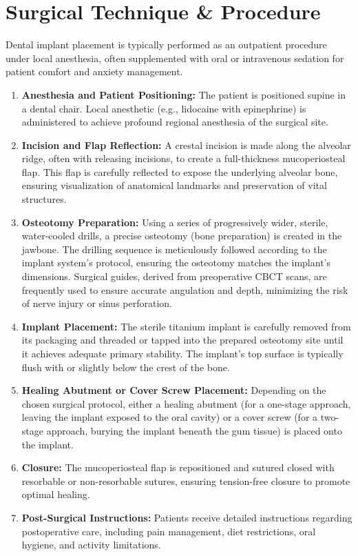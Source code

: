 \section*{Surgical Technique \& Procedure}
Dental implant placement is typically performed as an outpatient procedure under local anesthesia, often supplemented with oral or intravenous sedation for patient comfort and anxiety management.

\begin{enumerate}
  \item \textbf{Anesthesia and Patient Positioning:} The patient is positioned supine in a dental chair. Local anesthetic (e.g., lidocaine with epinephrine) is administered to achieve profound regional anesthesia of the surgical site.
  
  \item \textbf{Incision and Flap Reflection:} A crestal incision is made along the alveolar ridge, often with releasing incisions, to create a full-thickness mucoperiosteal flap. This flap is carefully reflected to expose the underlying alveolar bone, ensuring visualization of anatomical landmarks and preservation of vital structures.
  
  \item \textbf{Osteotomy Preparation:} Using a series of progressively wider, sterile, water-cooled drills, a precise osteotomy (bone preparation) is created in the jawbone. The drilling sequence is meticulously followed according to the implant system's protocol, ensuring the osteotomy matches the implant's dimensions. Surgical guides, derived from preoperative CBCT scans, are frequently used to ensure accurate angulation and depth, minimizing the risk of nerve injury or sinus perforation.
  
  \item \textbf{Implant Placement:} The sterile titanium implant is carefully removed from its packaging and threaded or tapped into the prepared osteotomy site until it achieves adequate primary stability. The implant's top surface is typically flush with or slightly below the crest of the bone.
  
  \item \textbf{Healing Abutment or Cover Screw Placement:} Depending on the chosen surgical protocol, either a healing abutment (for a one-stage approach, leaving the implant exposed to the oral cavity) or a cover screw (for a two-stage approach, burying the implant beneath the gum tissue) is placed onto the implant.
  
  \item \textbf{Closure:} The mucoperiosteal flap is repositioned and sutured closed with resorbable or non-resorbable sutures, ensuring tension-free closure to promote optimal healing.
  
  \item \textbf{Post-Surgical Instructions:} Patients receive detailed instructions regarding postoperative care, including pain management, diet restrictions, oral hygiene, and activity limitations.
\end{enumerate}

